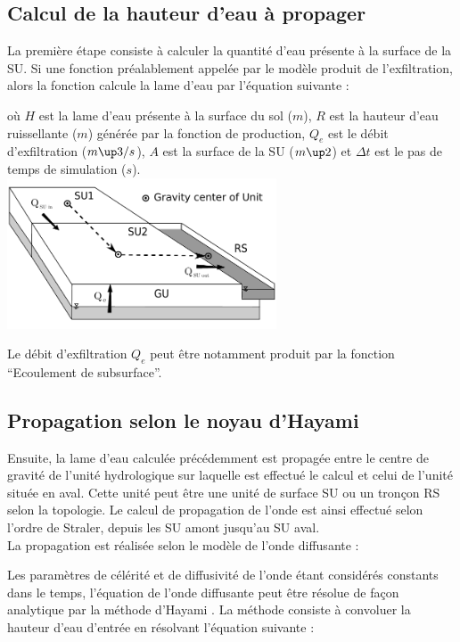 \subsection{Calcul de la hauteur d'eau à propager}
La première étape consiste à calculer la quantité d'eau présente à la surface de la SU. Si une fonction préalablement appelée par le modèle produit de l'exfiltration, alors la fonction calcule la lame d'eau par l'équation suivante :



où $H$ est la lame d'eau présente à la surface du sol ($m$), $R$ est la hauteur d'eau ruissellante ($m$) générée par la fonction de production, $Q_e$ est le débit d'exfiltration ($m\up3/s$), $A$ est la surface de la SU ($m\up2$) et $\Delta t$ est le pas de temps de simulation ($s$).\\

\includegraphics[width=8cm]{common/Schema_GU_RS_SU_Hayami_SU.pdf}

Le débit d'exfiltration $Q_e$ peut être notamment produit par la fonction ``Ecoulement de subsurface''.\\


\subsection{Propagation selon le noyau d'Hayami}
Ensuite, la lame d'eau calculée précédemment est propagée entre le centre de gravité de l'unité hydrologique sur laquelle est effectué le calcul et celui de l'unité située en aval. Cette unité peut être une unité de surface SU ou un tronçon RS selon la topologie. Le calcul de propagation de l'onde est ainsi effectué selon l'ordre de Straler, depuis les SU amont jusqu'au SU aval.\\

La propagation est réalisée selon le modèle de l'onde diffusante :



Les paramètres de célérité et de diffusivité de l'onde étant considérés constants dans le temps, l'équation de l'onde diffusante peut être résolue de façon analytique par la méthode d'Hayami \cite{Moussa1996}. La méthode consiste à convoluer la hauteur d'eau d'entrée en résolvant l'équation suivante :

